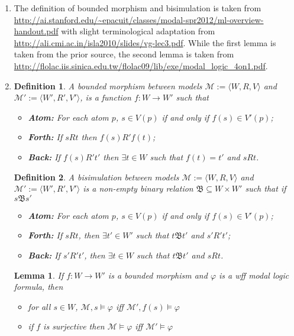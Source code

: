 \documentclass[11pt,a4paper]{article}
\newtheorem{lemma}[theorem]{Lemma}
\newtheorem{mydef}{Definition}
\begin{document}
\begin{enumerate}
\item The definition of bounded morphism and bisimulation is taken from \url{http://ai.stanford.edu/~epacuit/classes/modal-spr2012/ml-overview-handout.pdf} with slight terminological adaptation from \url{http://ali.cmi.ac.in/isla2010/slides/vg-lec3.pdf}. While the first lemma is taken from the prior source, the second lemma is taken from \url{http://flolac.iis.sinica.edu.tw/flolac09/lib/exe/modal_logic_4on1.pdf}.

\item 
\begin{mydef}
A bounded morphism between models $\mathcal{M}:=\langle W, R, V \rangle$ and $\mathcal{M}':=\langle W', R', V' \rangle$, is a function $f: W \to W'$ such that
\begin{itemize}
\item \textbf{Atom:} For each atom $p$, $s \in V(p)$ if and only if $f(s) \in V'(p)$;
\item \textbf{Forth:} If $sRt$ then $f(s)R'f(t)$;
\item \textbf{Back:} If $f(s)R't'$ then $\exists t\in W$ such that $f(t)=t'$ and $sRt$.
\end{itemize}
\end{mydef}



\begin{mydef}
A bisimulation between models $\mathcal{M}:=\langle W, R, V \rangle$ and $\mathcal{M}':=\langle W', R', V' \rangle$ is a non-empty binary relation $\mathfrak{B} \subseteq W \times W'$ such that if $s\mathfrak{B}s'$
\begin{itemize}
\item \textbf{Atom:} For each atom $p$, $s \in V(p)$ if and only if $f(s) \in V'(p)$;
\item \textbf{Forth:} If $sRt$, then $\exists t' \in W'$ such that $t\mathfrak{B}t'$ and $s'R't'$;
\item \textbf{Back:}  If $s'R't'$, then $\exists t \in W$ such that $t\mathfrak{B}t'$ and $sRt$.
\end{itemize}
\end{mydef}


\begin{lemma}
If $f: W \to W'$ is a bounded morphism and $\varphi$ is a wff modal logic formula, then
\begin{itemize}
\item for all $s \in W$, $\mathcal{M},s \models \varphi$ iff $\mathcal{M}', f(s) \models \varphi$
\item if $f$ is surjective then $\mathcal{M}\models \varphi$ iff $\mathcal{M}' \models \varphi$
\end{itemize}
\end{lemma}


\end{enumerate}
\end{document}
